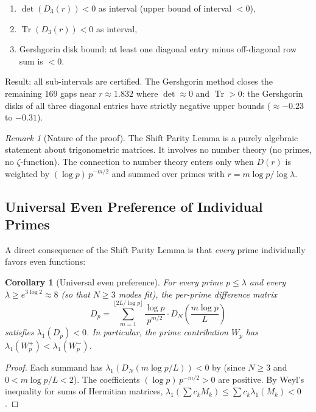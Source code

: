 \documentclass[12pt,a4paper]{article}
\newtheorem{corollary}[theorem]{Corollary}
\theoremstyle{definition}
\theoremstyle{remark}
\newtheorem{remark}[theorem]{Remark}
\begin{document}
\begin{enumerate}
  \item $\det(D_3(r)) < 0$ as interval (upper bound of interval $< 0$),
  \item $\operatorname{Tr}(D_3(r)) < 0$ as interval,
  \item Gershgorin disk bound: at least one diagonal entry minus off-diagonal row sum is $< 0$.
\end{enumerate}

\noindent Result: all sub-intervals are certified. The Gershgorin method closes the remaining 169 gaps near $r \approx 1.832$ where $\det \approx 0$ and $\operatorname{Tr} > 0$: the Gershgorin disks of all three diagonal entries have strictly negative upper bounds ($\approx -0.23$ to $-0.31$).

\begin{remark}[Nature of the proof]
The Shift Parity Lemma is a purely algebraic statement about trigonometric matrices. It involves no number theory (no primes, no $\zeta$-function). The connection to number theory enters only when $D(r)$ is weighted by $(\log p)\,p^{-m/2}$ and summed over primes with $r = m\log p / \log\lambda$.
\end{remark}

\subsection{Universal Even Preference of Individual Primes}

A direct consequence of the Shift Parity Lemma is that \emph{every} prime individually favors even functions:

\begin{corollary}[Universal even preference]
\label{cor:universal}
For every prime $p \leq \lambda$ and every $\lambda \geq e^{3\log 2} \approx 8$ (so that $N \geq 3$ modes fit), the per-prime difference matrix
\[
  D_p = \sum_{m=1}^{\lfloor 2L/\log p \rfloor} \frac{\log p}{p^{m/2}} \cdot D_N\!\left(\frac{m\log p}{L}\right)
\]
satisfies $\lambda_1(D_p) < 0$. In particular, the prime contribution $W_p$ has $\lambda_1(W_p^+) < \lambda_1(W_p^-)$.
\end{corollary}

\begin{proof}
Each summand has $\lambda_1(D_N(m\log p/L)) < 0$ by  (since $N \geq 3$ and $0 < m\log p/L < 2$). The coefficients $(\log p)\,p^{-m/2} > 0$ are positive. By Weyl's inequality for sums of Hermitian matrices, $\lambda_1(\sum c_k M_k) \leq \sum c_k \lambda_1(M_k) < 0$.
\end{proof}
\end{document}
